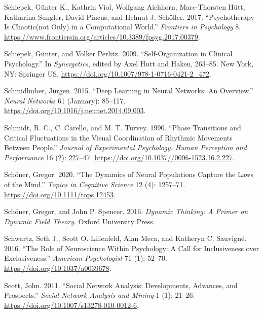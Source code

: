 \documentclass[
  a4paper,
  DIV=11,
  numbers=noendperiod,
  oneside]{scrreprt}
\newlength{\cslhangindent}
\newlength{\cslentryspacingunit} %
\newenvironment{CSLReferences}[2] %
 {%
  \setlength{\parindent}{0pt}
  \ifodd #1
  \let\oldpar\par
  \def\par{\hangindent=\cslhangindent\oldpar}
  \fi
  \setlength{\parskip}{#2\cslentryspacingunit}
 }%
 {}
\begin{document}
\begin{CSLReferences}{1}{0}
\leavevmode{}%
Schiepek, Günter K., Kathrin Viol, Wolfgang Aichhorn, Marc-Thorsten
Hütt, Katharina Sungler, David Pincus, and Helmut J. Schöller. 2017.
{``Psychotherapy Is Chaotic{\textemdash}(not Only) in a Computational
World.''} \emph{Frontiers in Psychology} 8.
\url{https://www.frontiersin.org/articles/10.3389/fpsyg.2017.00379}.

\leavevmode{}%
Schiepek, Günter, and Volker Perlitz. 2009. {``Self-{Organization} in
{Clinical Psychology}.''} In \emph{Synergetics}, edited by Axel Hutt and
Haken, 263--85. {New York, NY}: {Springer US}.
\url{https://doi.org/10.1007/978-1-0716-0421-2_472}.

\leavevmode{}%
Schmidhuber, Jürgen. 2015. {``Deep Learning in Neural Networks: {An}
Overview.''} \emph{Neural Networks} 61 (January): 85--117.
\url{https://doi.org/10.1016/j.neunet.2014.09.003}.

\leavevmode{}%
Schmidt, R. C., C. Carello, and M. T. Turvey. 1990. {``Phase Transitions
and Critical Fluctuations in the Visual Coordination of Rhythmic
Movements Between People.''} \emph{Journal of Experimental Psychology.
Human Perception and Performance} 16 (2): 227--47.
\url{https://doi.org/10.1037//0096-1523.16.2.227}.

\leavevmode{}%
Schöner, Gregor. 2020. {``The {Dynamics} of {Neural Populations Capture}
the {Laws} of the {Mind}.''} \emph{Topics in Cognitive Science} 12 (4):
1257--71. \url{https://doi.org/10.1111/tops.12453}.

\leavevmode{}%
Schöner, Gregor, and John P. Spencer. 2016. \emph{Dynamic Thinking: {A}
Primer on Dynamic Field Theory}. {Oxford University Press}.

\leavevmode{}%
Schwartz, Seth J., Scott O. Lilienfeld, Alan Meca, and Katheryn C.
Sauvigné. 2016. {``The Role of Neuroscience Within Psychology: A Call
for Inclusiveness over Exclusiveness.''} \emph{American Psychologist} 71
(1): 52--70. \url{https://doi.org/10.1037/a0039678}.

\leavevmode{}%
Scott, John. 2011. {``Social Network Analysis: Developments, Advances,
and Prospects.''} \emph{Social Network Analysis and Mining} 1 (1):
21--26. \url{https://doi.org/10.1007/s13278-010-0012-6}.


\end{CSLReferences}
\end{document}
